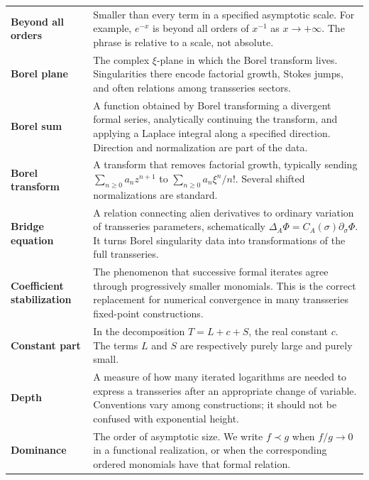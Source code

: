 \documentclass[11pt,openany]{book}
\theoremstyle{definition}
\theoremstyle{plain}
\theoremstyle{remark}
\newcommand{\precdom}{\prec}
\newcommand{\alien}{\Delta}
\begin{document}
\begin{longtable}{@{}p{}p{}@{}}
\textbf{Beyond all orders}\index{beyond all orders}
& Smaller than every term in a specified asymptotic scale. For example,
$e^{-x}$ is beyond all orders of $x^{-1}$ as $x\to+\infty$. The phrase is
relative to a scale, not absolute.\\

\textbf{Borel plane}\index{Borel plane}
& The complex $\xi$-plane in which the Borel transform lives. Singularities
there encode factorial growth, Stokes jumps, and often relations among
transseries sectors.\\

\textbf{Borel sum}\index{Borel sum}
& A function obtained by Borel transforming a divergent formal series,
analytically continuing the transform, and applying a Laplace integral along
a specified direction. Direction and normalization are part of the data.\\

\textbf{Borel transform}\index{Borel transform}
& A transform that removes factorial growth, typically sending
$\sum_{n\ge0}a_n z^{n+1}$ to $\sum_{n\ge0}a_n\xi^n/n!$. Several shifted
normalizations are standard.\\

\textbf{Bridge equation}\index{bridge equation}
& A relation connecting alien derivatives to ordinary variation of
transseries parameters, schematically
$\alien_A\Phi=C_A(\sigma)\partial_\sigma\Phi$. It turns Borel singularity data
into transformations of the full transseries.\\

\textbf{Coefficient stabilization}\index{coefficient stabilization}
& The phenomenon that successive formal iterates agree through progressively
smaller monomials. This is the correct replacement for numerical convergence
in many transseries fixed-point constructions.\\

\textbf{Constant part}\index{constant part}
& In the decomposition $T=L+c+S$, the real constant $c$. The terms $L$ and
$S$ are respectively purely large and purely small.\\

\textbf{Depth}\index{logarithmic depth}
& A measure of how many iterated logarithms are needed to express a
transseries after an appropriate change of variable. Conventions vary among
constructions; it should not be confused with exponential height.\\

\textbf{Dominance}\index{dominance}
& The order of asymptotic size. We write $f\precdom g$ when $f/g\to0$ in a
functional realization, or when the corresponding ordered monomials have that
formal relation.\\


\end{longtable}
\end{document}
